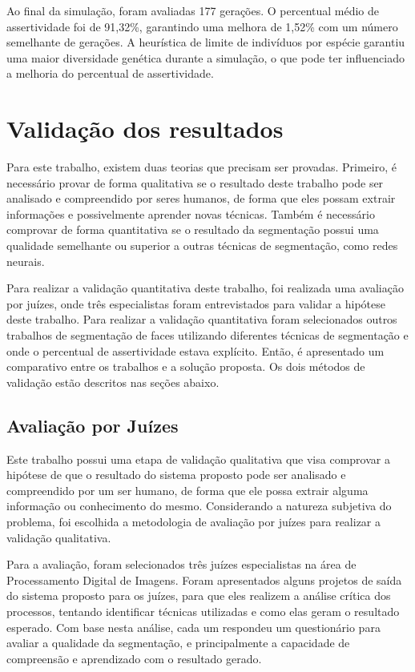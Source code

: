 \documentclass[12pt,oneside,a4paper,english,french,spanish,brazil,]{abntex2}
\begin{document}
Ao final da simulação, foram avaliadas 177 gerações. O percentual médio de assertividade foi de 91,32\%, garantindo uma melhora de 1,52\% com um número semelhante de gerações. A heurística de limite de indivíduos por espécie garantiu uma maior diversidade genética durante a simulação, o que pode ter influenciado a melhoria do percentual de assertividade.

\section{Validação dos resultados}

Para este trabalho, existem duas teorias que precisam ser provadas. Primeiro, é necessário provar de forma qualitativa se o resultado deste trabalho pode ser analisado e compreendido por seres humanos, de forma que eles possam extrair informações e possivelmente aprender novas técnicas. Também é necessário comprovar de forma quantitativa se o resultado da segmentação possui uma qualidade semelhante ou superior a outras técnicas de segmentação, como redes neurais.

Para realizar a validação quantitativa deste trabalho, foi realizada uma avaliação por juízes, onde três especialistas foram entrevistados para validar a hipótese deste trabalho. Para realizar a validação quantitativa foram selecionados outros trabalhos de segmentação de faces utilizando diferentes técnicas de segmentação e onde o percentual de assertividade estava explícito. Então, é apresentado um comparativo entre os trabalhos e a solução proposta. Os dois métodos de validação estão descritos nas seções abaixo.

\subsection{Avaliação por Juízes}

Este trabalho possui uma etapa de validação qualitativa que visa comprovar a hipótese de que o resultado do sistema proposto pode ser analisado e compreendido por um ser humano, de forma que ele possa extrair alguma informação ou conhecimento do mesmo. Considerando a natureza subjetiva do problema, foi escolhida a metodologia de avaliação por juízes para realizar a validação qualitativa.

Para a avaliação, foram selecionados três juízes especialistas na área de Processamento Digital de Imagens. Foram apresentados alguns projetos de saída do sistema proposto para os juízes, para que eles realizem a análise crítica dos processos, tentando identificar técnicas utilizadas e como elas geram o resultado esperado. Com base nesta análise, cada um respondeu um questionário para avaliar a qualidade da segmentação, e principalmente a capacidade de compreensão e aprendizado com o resultado gerado.
\end{document}
